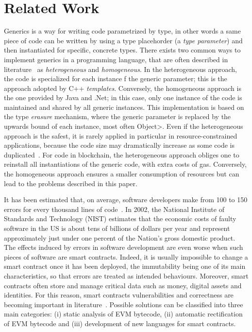 \section{Related Work}\label{sec:related_work}

Generics is a way for writing code parametrized by type, in other words 
a same piece of code can be written by using a type placehorder 
(a \emph{type parameter}) and then instantiated for specific,
concrete types. There exists two common ways to implement generics in 
a programming language, that are often described in literature~\cite{generics_categories}
as \emph{heterogeneous} and \emph{homogeneous}. In the heterogeneous 
approach, the code is specialized for each instance
f the generic parameter; this is the approach adopted by C++ \emph{templates}.
Conversely, the homogeneous approach is the one provided by Java and .Net; 
in this case, only one instance of the code is maintained and shared by 
all generic instances.
This implementation is based on the type \emph{erasure} mechanism, where the 
generic parameter is replaced by the upwards bound of each instance, most 
often \<Object>.
Even if the heterogeneous approach is the safest, it is rarely applied in particular
in resource-constrained applications, because the code size may dramatically increase
as some code is duplicated~\cite{generics_embedded_systems}. For code in blockchain,
the heterogeneous approach obliges one to reinstall all instantiations of the 
generic code, with extra costs of gas.
Conversely, the homogeneous approach ensures a smaller consumption
of resources but can lead to the problems described in this paper.

It has been estimated that, on average, software developers make from 100 to 150 errors
for every thousand lines of code~\cite{software_engineering}.
In 2002, the National Institute of Standards and Technology (NIST) estimates that the economic
costs of faulty software in the US is about tens of billions of dollars per year and represent
approximately just under one percent of the Nation's gross domestic product.
The effects induced by errors in software development are even worse when such pieces of software
are smart contracts. Indeed, it is usually impossible to change a smart contract once
it has been deployed, the immutability being one of its main characteristics, so that
errors are treated as intended behaviours. Moreover, smart contracts often store and
manage critical data such as money, digital assets and identities. For this reason, smart contracts
vulnerabilities and correctness are becoming important in literature~\cite{smart_contracts_verification}. Possible solutions can be
classified into three main categories: (i) static analysis of EVM bytecode,
(ii) automatic rectification of EVM bytecode and (iii) development of new languages
for smart contracts.

